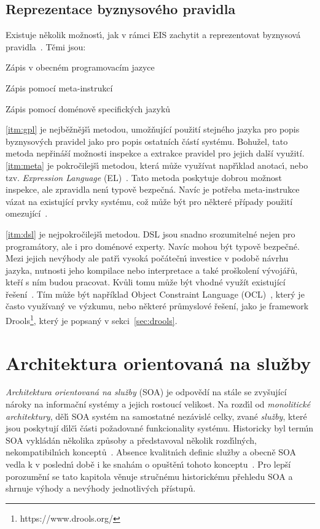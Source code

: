 \subsection{Reprezentace byznysového pravidla}

Existuje několik možnost\'{\i}, jak v rámci \gls{EIS} zachytit a reprezentovat byznysová
pravidla~\cite{cemus2015automated}. Těmi jsou:

\benum[label=\circledAlph]
    \item\label{itm:gpl} Zápis v obecném programovacím jazyce
    \item\label{itm:meta} Zápis pomocí meta-instrukcí
    \item\label{itm:dsl} Zápis pomocí doménově specifických jazyků
\eenum

\ref{itm:gpl} je nejběžnějš\'{\i} metodou, umožňující použití stejného jazyka pro popis byznysových pravidel jako
pro popis ostatních částí systému. Bohužel, tato metoda nepřináší možnosti inspekce a extrakce pravidel pro jejich další využití.
\ref{itm:meta} je pokročilejš\'{\i} metodou, která může využívat např\'{\i}klad anotac\'{\i}, nebo tzv. \textit{Expression Language}
(\gls{EL})~\cite{nemuraite2008representation}. Tato metoda poskytuje dobrou možnost inspekce, ale zpravidla nen\'{\i} typově bezpečná.
Navíc je potřeba meta-instrukce vázat na existující prvky systému, což může být pro některé případy použití omezující~\cite{cemus2015automated}.

\ref{itm:dsl} je nejpokročilejš\'{\i} metodou. \gls{DSL} jsou snadno srozumitelné nejen pro programátory, ale i pro doménové experty.
Navíc mohou b\'yt typově bezpečné. Mezi jejich nev\'yhody ale patř\'{\i} vysoká počátečn\'{\i} investice v podobě návrhu jazyka, nutnosti
jeho kompilace nebo interpretace a také proškolení vývojářů, kteří s ním budou pracovat. Kvůli tomu může být vhodné využít
existující řešení~\cite{cemus2015automated}. Tím může být například Object Constraint Language (\gls{OCL})~\cite{warmer1998object},
který je často využívaný ve výzkumu, nebo některé průmyslové řešení, jako je framework Drools\footnote{https://www.drools.org/},
který je popsaný v sekci~\ref{sec:drools}.

\section{Architektura orientovaná na služby}\label{sec:soa}

\textit{Architektura orientovaná na služby} (\gls{SOA}) je odpovědí na stále se zvyšující
nároky na informační systémy a jejich rostoucí velikost. Na rozd\'{\i}l od \textit{monolitické architektury},
děl\'{\i} \gls{SOA} systém na samostatné nezávislé celky, zvané \textit{služby}, které jsou
poskytují d\'{\i}lč\'{\i} části požadované funkcionality systému.
Historicky byl term\'{\i}n \gls{SOA} vykládán několika způsoby a představoval
několik rozd\'{\i}ln\'ych, nekompatibiln\'{\i}ch konceptů~\cite{fowler2005serviceorientedambiguity}.
Absence kvalitn\'{\i}ch definic služby a obecně \gls{SOA} vedla k v posledn\'{\i} době i ke snahám
o opuštěn\'{\i} tohoto konceptu~\cite{cerny2017disambiguation}.
Pro lepší porozumění se tato kapitola věnuje stručnému historickému přehledu \gls{SOA}
a shrnuje výhody a nevýhody jednotlivých přístupů.

